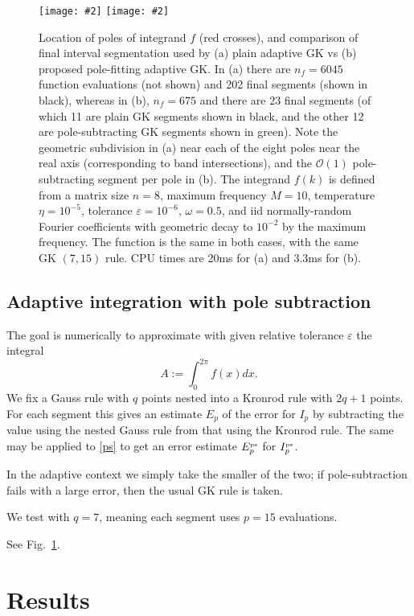 \documentclass[11pt]{article}
\newcommand{\be}{\begin{equation}}
\newcommand{\ee}{\end{equation}}
\newcommand{\bfi}{\begin{figure}}
\newcommand{\efi}{\end{figure}}
\newcommand{\ca}[2]{\caption{#1 \label{#2}}}
\newcommand{\ig}[2]{\texttt{[image: \#2]}}
\newcommand{\tbox}[1]{{\mbox{\tiny #1}}}
\newcommand{\eps}{\varepsilon}
\newcommand{\bigO}{{\mathcal O}}
\begin{document}
  
\bfi %
\ig{width=\textwidth}{segsa}
\ig{width=\textwidth}{segsb}
\ca{Location of poles of integrand $f$ (red crosses),
  and comparison of final interval segmentation
  used by (a) plain adaptive GK vs (b) proposed pole-fitting adaptive GK.
  In (a) there are $n_f = 6045$ function evaluations (not shown) and 202 final segments
  (shown in black), whereas in (b), $n_f=675$ and there are 23 final segments
  (of which 11 are plain GK segments shown in black, and the other 12
  are pole-subtracting GK segments shown in green).
  Note the geometric subdivision in (a) near each of the
  eight poles near the real axis (corresponding to band intersections),
  and the $\bigO(1)$ pole-subtracting segment per pole in (b).
  The integrand $f(k)$ is defined from a matrix size
  $n=8$, maximum frequency $M=10$, temperature $\eta=10^{-5}$,
  tolerance $\eps=10^{-6}$, $\omega=0.5$, and iid normally-random
  Fourier coefficients with geometric decay to $10^{-2}$ by the maximum frequency.
  The function is the same in both cases, with the same GK $(7,15)$ rule.
  CPU times are 20ms for (a) and 3.3ms for (b).
}{f:polesegs}
\efi


\subsection{Adaptive integration with pole subtraction}
  
The goal is numerically to approximate with given relative tolerance $\eps$ the
integral
\be
A := \int_0^{2\pi} f(x) dx.
\label{Aagain}
\ee
We fix a Gauss rule with $q$ points nested into a Kronrod rule with $2q+1$ points.
For each segment this gives an estimate $E_p$ of the error for $I_p$ by subtracting
the value using the nested Gauss rule from that using the Kronrod rule.
The same may be applied to \eqref{ps} to get an error estimate
$E^{\tbox{ps}}_p$ for $I^{\tbox{ps}}_p$.

In the adaptive context we simply take the smaller of the two;
if pole-subtraction fails with a large error, then the usual GK rule is taken.



We test with $q=7$, meaning each segment uses $p=15$ evaluations.

See Fig.~\ref{f:polesegs}.


\section{Results}
\end{document}
